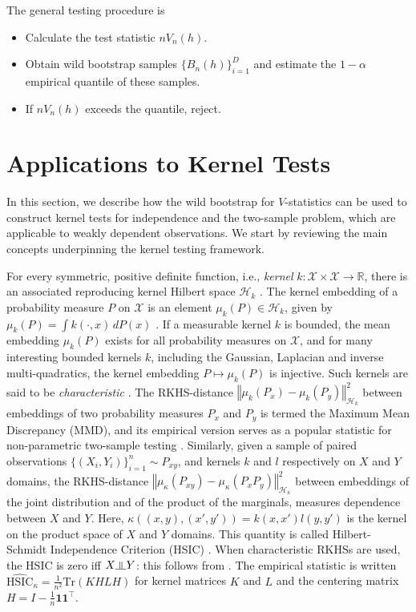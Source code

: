 The general testing procedure is 

\begin{itemize}
\item Calculate the test statistic $n V_{n}(h)$.

\item Obtain wild bootstrap samples $\{B_{n}(h)\}_{i=1}^{D}$
and estimate the $1-\alpha$ empirical quantile of these samples. 
\item If $n V_{n}(h)$ exceeds the quantile, reject.
\end{itemize}




\section{Applications to Kernel Tests}\label{sec:mmd_hsic}
In this section, we describe how the wild bootstrap for $V$-statistics can be used to construct kernel tests for independence and the two-sample problem, which are applicable to weakly dependent observations. We start by reviewing the main concepts underpinning the kernel testing framework.

For every symmetric, positive definite function, i.e., \emph{kernel} $k:\mathcal{X}\times\mathcal{X}\to\mathbb{R}$,
there is an associated reproducing kernel Hilbert space $\mathcal{H}_{k}$ \cite[p. 19]{BerTho04}.  The kernel embedding of a probability measure
$P$ on $\mathcal{X}$ is an element $\mu_{k}(P)\in\mathcal{H}_{k}$,
given by $\mu_{k}(P)=\int k(\cdot,x)\, dP(x)$ \cite{BerTho04,SmoGreSonSch07}.
If a measurable kernel $k$ is bounded, the mean embedding $\mu_{k}(P)$
exists for all probability measures on $\mathcal{X}$, and for many interesting
bounded kernels $k$, including the Gaussian, Laplacian and inverse
multi-quadratics, the kernel embedding $P\mapsto\mu_{k}(P)$ is injective.
Such kernels are said to be \emph{characteristic} \cite{SriGreFukLanetal10}.
The RKHS-distance $\left\Vert \mu_k(P_x)-\mu_k(P_y)\right\Vert_{{\mathcal H}_k}^2$ between embeddings of two probability measures $P_x$ and $P_y$
is termed the Maximum Mean Discrepancy (MMD), and its empirical version serves as a popular statistic for non-parametric two-sample testing \cite{gretton2012kernel}.
Similarly, given a sample of paired observations $\{(X_i,Y_i)\}_{i=1}^n\sim P_{xy}$, and kernels $k$ and $l$ respectively on $X$ and $Y$ domains, the RKHS-distance 
$\left\Vert \mu_\kappa(P_{xy})-\mu_\kappa(P_x P_y)\right\Vert_{{\mathcal H}_{\kappa}}^2$ between embeddings of the joint distribution and of the product of the marginals, measures dependence between $X$ and $Y$. Here, $\kappa((x,y),(x',y'))=k(x,x')l(y,y')$ is the kernel on the product space of $X$ and $Y$ domains.
This quantity is called Hilbert-Schmidt Independence Criterion (HSIC) \cite{gretton_measuring_2005,gretton_kernel_2008}. When characteristic RKHSs are used, the HSIC is zero iff $X \indep Y$: this follows from \cite{Asimplercondition}.
The  empirical statistic is written $\widehat{\text{HSIC}}_{\kappa} = \frac{1}{n^2}\text{Tr}(KHLH)$ for kernel matrices $K$ and $L$ and the centering matrix $H=I-\frac{1}{n}\mathbf{1}\mathbf{1}^\top$.

